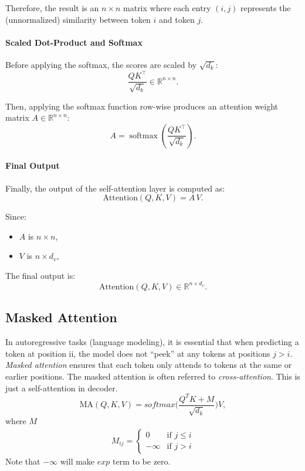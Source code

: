    
   Therefore, the result is an \( n \times n \) matrix where each entry \((i,j)\) represents the (unnormalized) similarity between token \( i \) and token \( j \).

   \paragraph{Scaled Dot-Product and Softmax}

   Before applying the softmax, the scores are scaled by \( \sqrt{d_k} \):
   \[
   \frac{QK^\top}{\sqrt{d_k}} \in \mathbb{R}^{n \times n}.
   \]
   
   Then, applying the softmax function row-wise produces an attention weight matrix \( A \in \mathbb{R}^{n \times n} \):
   \[
   A = \operatorname{softmax}\!\left(\frac{QK^\top}{\sqrt{d_k}}\right).
   \]

   \paragraph{Final Output}
   Finally, the output of the self-attention layer is computed as:
   \[
   \text{Attention}(Q, K, V) = A\,V.
   \]
   
   Since:
   \begin{itemize}
	   \item \( A \) is \( n \times n \),
	   \item \( V \) is \( n \times d_v \),
   \end{itemize}
   
   The final output is:
   \[
   \text{Attention}(Q, K, V) \in \mathbb{R}^{n \times d_v}.
   \]

\subsection{Masked Attention}
In autoregressive tasks (\eg language modeling), it is essential that when predicting a token at position ii, the model does not ``peek'' at any tokens at positions $j>i$. \textit{Masked attention} ensures that each token only attends to tokens at the same or earlier positions. The masked attention is often referred to \textit{cross-attention}. This is just a self-attention in decoder.
$$\textrm{MA}(Q,K,V) = softmax\bigg(\frac{Q^TK+M}{\sqrt{d_k}}\bigg)V,$$
where $M$ 
\begin{align*}
	M_{ij} = \begin{cases}
		0&\text{if } j\leq i\\
		-\infty&\text{if } j>i
	\end{cases}
\end{align*}
Note that $-\infty$ will make $exp$ term to be zero.


